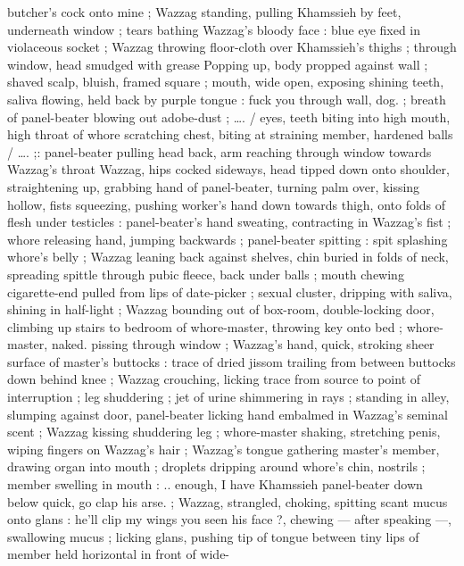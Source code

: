 butcher's cock onto mine{\td} {\gr} ; Wazzag standing, pulling Khamssieh by 
feet, underneath window ; tears bathing Wazzag's bloody face : blue 
eye fixed in violaceous socket ; Wazzag throwing floor-cloth over 
Khamssieh's thighs ; through window, head smudged with grease 
Popping up, body propped against wall ; shaved scalp, bluish, framed 
square ; mouth, wide open, exposing shining teeth, saliva flowing, 
held back by purple tongue : {\gl} {\td} fuck you through wall, dog. {\gr} ; 
breath of panel-beater blowing out adobe-dust ; {\ldots}. {\slash} eyes, teeth 
biting into high mouth, high throat of whore scratching chest, biting 
at straining member, hardened balls {\slash} {\ldots}. ;: panel-beater pulling head 
back, arm reaching through window towards Wazzag's throat 
Wazzag, hips cocked sideways, head tipped down onto shoulder, 
straightening up, grabbing hand of panel-beater, turning palm over, 
kissing hollow, fists squeezing, pushing worker's hand down towards 
thigh, onto folds of flesh under testicles : panel-beater's hand 
sweating, contracting in Wazzag's fist ; whore releasing hand, 
jumping backwards ; panel-beater spitting : spit splashing whore's 
belly ; Wazzag leaning back against shelves, chin buried in folds of 
neck, spreading spittle through pubic fleece, back under balls ; 
mouth chewing cigarette-end pulled from lips of date-picker ; sexual 
cluster, dripping with saliva, shining in half-light ; Wazzag bounding 
out of box-room, double-locking door, climbing up stairs to bedroom 
of whore-master, throwing key onto bed ; whore-master, naked. 
pissing through window ; Wazzag's hand, quick, stroking sheer 
surface of master's buttocks : trace of dried jissom trailing from 
between buttocks down behind knee ; Wazzag crouching, licking 
trace from source to point of interruption ; leg shuddering ; jet of 
urine shimmering in rays ; standing in alley, slumping against door, 
panel-beater licking hand embalmed in Wazzag's seminal scent ; 
Wazzag kissing shuddering leg ; whore-master shaking, stretching 
penis, wiping fingers on Wazzag's hair ; Wazzag's tongue gathering 
master's member, drawing organ into mouth ; droplets dripping 
around whore's chin, nostrils ; member swelling in mouth : {\gl} .. 
enough, I have Khamssieh{\td} panel-beater down below{\td} quick, go clap 
his arse. {\gr} ; Wazzag, strangled, choking, spitting scant mucus onto 
glans : {\gl} {\td} he'll clip my wings{\fourdots} you seen his face ?{\td}{\gr}, chewing --- 
after speaking ---, swallowing mucus ; licking glans, pushing tip of 
tongue between tiny lips of member held horizontal in front of wide- 
